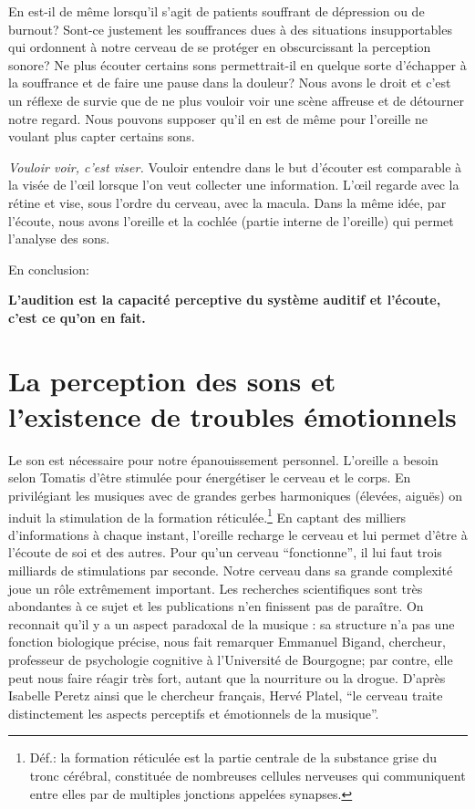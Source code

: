 En est-il de même lorsqu'il s'agit de patients souffrant de dépression
ou de burnout? Sont-ce justement les souffrances dues à des situations
insupportables qui
ordonnent à notre cerveau de se protéger en obscurcissant la
perception sonore?  Ne plus écouter certains
sons permettrait-il en quelque sorte d'échapper à la souffrance et de faire une
pause dans la douleur? Nous avons le droit et c'est un réflexe de
survie que de ne plus vouloir voir une scène affreuse et de détourner
notre regard. Nous pouvons supposer qu'il en est de même pour l'oreille ne voulant plus capter
certains sons.


 \emph{Vouloir voir, c'est viser.}  Vouloir entendre dans le but d'écouter est comparable  à
la visée de l'\oe il lorsque l'on veut collecter une
information. L'\oe il regarde avec la rétine et  vise, sous l'ordre du
cerveau, avec la macula. Dans la même idée, par l'écoute, nous avons
l'oreille et la cochlée (partie interne de l'oreille) qui permet
l'analyse des sons.

En conclusion:


 \textbf{ L'audition est la capacité perceptive du système auditif et l'écoute, c'est ce qu'on en fait.}


\section{La perception des sons et l'existence de troubles
  émotionnels}

         Le son est nécessaire pour 
notre
		épanouissement personnel. L'oreille a besoin selon Tomatis d'être stimulée 
pour
		énergétiser le cerveau et le corps. En privilégiant les 
musiques avec
		de grandes gerbes harmoniques (élevées, aiguës) on
                 induit la 
stimulation
		de la formation réticulée.\footnote{Déf.: la formation 
réticulée est la partie centrale de la substance grise du tronc cérébral, 
constituée de nombreuses cellules nerveuses qui communiquent entre elles par de 
multiples jonctions appelées synapses.} En captant des milliers d'informations
		à chaque instant, l'oreille recharge le cerveau et lui permet 
d'être
		à l'écoute de soi et des autres. Pour qu'un cerveau 
``fonctionne'',
		il lui faut trois milliards de stimulations par seconde.
Notre cerveau  dans sa grande complexité joue un rôle extrêmement important.
Les recherches scientifiques sont très abondantes à ce sujet et les publications n'en finissent pas de paraître.
On reconnait qu'il y a un aspect paradoxal de la musique : sa structure n'a pas une 
fonction biologique précise, nous fait remarquer Emmanuel Bigand,  chercheur, professeur 
de psychologie cognitive à l'Université 
de Bourgogne; par contre, elle peut nous faire réagir très fort, autant que la nourriture ou la 
drogue. \autocite[Voir ch. 3 p. 35, "Vous avez l'oreille musicale"]{bigand:cerveau}
D'après Isabelle Peretz
\autocite[<<\,Les agnosies auditives\,>>, pp. 205--216]{seron.baron.ea:neuropsychologie}
ainsi que le chercheur français, Hervé Platel,%
\autocite[pp. 223--224]{platel_neuropsychology_2002}
 \enquote{le cerveau traite distinctement les aspects perceptifs et émotionnels de la 
 musique}.

